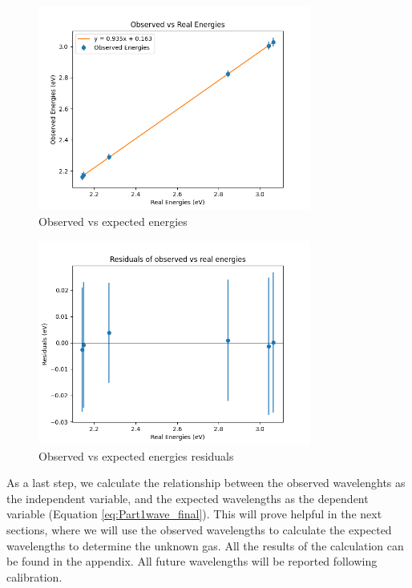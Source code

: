 \begin{figure}[H]
    \centering
    \includegraphics[width=0.8\textwidth]{Results/Sections/Part1/Part1_energy_observed_vs_expected.png}
    \caption{Observed vs expected energies}
    \label{fig:Part1energy}
\end{figure}

\begin{figure}
    \centering
    \includegraphics[width=0.8\textwidth]{Results/Sections/Part1/Part1_energy_observed_vs_expected_residuals.png}
    \caption{Observed vs expected energies residuals}
    \label{fig:Part1energyU}
\end{figure}

As a last step, we calculate the relationship between the observed wavelenghts as the independent variable, and the expected wavelengths as the dependent variable (Equation \ref{eq:Part1wave_final}).
This will prove helpful in the next sections, where we will use the observed wavelengths to calculate the expected wavelengths to determine the unknown gas.
All the results of the calculation can be found in the appendix. All future wavelengths will be reported following calibration.

